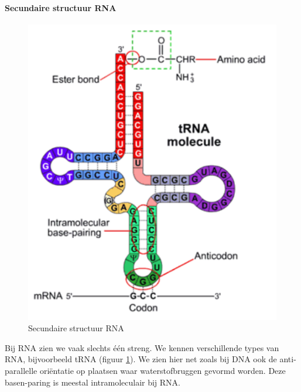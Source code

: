 \documentclass[a4paper,kul]{kulakarticle} %
\begin{document}
\paragraph{Secundaire structuur RNA}
\begin{figure}[h]
	\centering
	\includegraphics[width=0.5\linewidth]{SecundaireStructuurRNA}
	\caption[Secundaire structuur RNA]{Secundaire structuur RNA}
	\label{fig:secundairestructuurrna}
\end{figure}
Bij RNA zien we vaak slechts één streng. We kennen verschillende types van RNA, bijvoorbeeld tRNA (figuur \ref{fig:secundairestructuurrna}). We zien hier net zoals bij DNA ook de anti-parallelle oriëntatie op plaatsen waar waterstofbruggen gevormd worden. Deze basen-paring is meestal intramoleculair bij RNA. 
\newpage
\end{document}
